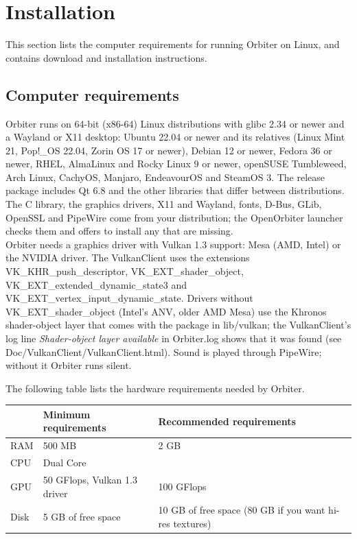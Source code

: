 \documentclass[Orbiter User Manual.tex]{subfiles}
\begin{document}
\section{Installation}
\label{sec:installation}
This section lists the computer requirements for running Orbiter on Linux, and contains download and installation instructions.

\subsection{Computer requirements}
\begin{sloppypar}
Orbiter runs on 64-bit (x86-64) Linux distributions with glibc 2.34 or newer and a Wayland or X11 desktop: Ubuntu 22.04 or newer and its relatives (Linux Mint 21, Pop!\_OS 22.04, Zorin OS 17 or newer), Debian 12 or newer, Fedora 36 or newer, RHEL, AlmaLinux and Rocky Linux 9 or newer, openSUSE Tumbleweed, Arch Linux, CachyOS, Manjaro, EndeavourOS and SteamOS 3. The release package includes Qt 6.8 and the other libraries that differ between distributions. The C library, the graphics drivers, X11 and Wayland, fonts, D-Bus, GLib, OpenSSL and PipeWire come from your distribution; the OpenOrbiter launcher checks them and offers to install any that are missing.\\
Orbiter needs a graphics driver with Vulkan 1.3 support: Mesa (AMD, Intel) or the NVIDIA driver. The VulkanClient uses the extensions VK\_\allowbreak KHR\_\allowbreak push\_\allowbreak descriptor, VK\_\allowbreak EXT\_\allowbreak shader\_\allowbreak object, VK\_\allowbreak EXT\_\allowbreak extended\_\allowbreak dynamic\_\allowbreak state3 and VK\_\allowbreak EXT\_\allowbreak vertex\_\allowbreak input\_\allowbreak dynamic\_\allowbreak state. Drivers without VK\_\allowbreak EXT\_\allowbreak shader\_\allowbreak object (Intel's ANV, older AMD Mesa) use the Khronos shader-object layer that comes with the package in lib/vulkan; the VulkanClient's log line \textit{Shader-object layer available} in Orbiter.log shows that it was found (see Doc/VulkanClient/VulkanClient.html). Sound is played through PipeWire; without it Orbiter runs silent.\\
\end{sloppypar}
\noindent
The following table lists the hardware requirements needed by Orbiter.

	\begin{longtable}{ |p{}|p{}|p{}| }
	\hline\rule{0pt}{2ex}
	& \textbf{Minimum requirements} & \textbf{Recommended requirements}\\
	\hline\rule{0pt}{2ex}
	RAM & 500 MB & 2 GB\\
	\hline\rule{0pt}{2ex}
	CPU & Dual Core &\\
	\hline\rule{0pt}{2ex}
	GPU & 50 GFlops, Vulkan 1.3 driver & 100 GFlops\\
	\hline\rule{0pt}{2ex}
	Disk & 5 GB of free space & 10 GB of free space (80 GB if you want hi-res textures)\\
	\hline
	\end{longtable}
\end{document}
